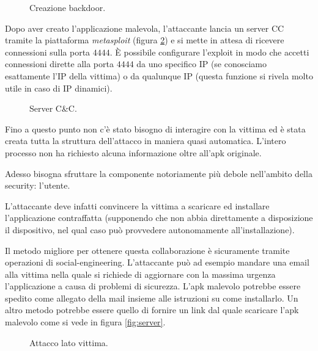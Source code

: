 \begin{figure}[h]
	\centering
	\caption{Creazione backdoor.}
	\label{fig:backdoor} 
\end{figure}

Dopo aver creato l'applicazione malevola, l'attaccante lancia un server \ac{CC} tramite la piattaforma \emph{metasploit} (figura \ref{fig:metasploit}) e si mette in attesa di ricevere connessioni sulla porta $4444$. È possibile configurare l'exploit in modo che accetti connessioni dirette alla porta $4444$ da uno specifico IP (se conosciamo esattamente l'IP della vittima) o da qualunque IP (questa funzione si rivela molto utile in caso di IP dinamici).

\begin{figure}[h]
	\centering
	\caption{Server C\&C.}
	\label{fig:metasploit}
\end{figure}

Fino a questo punto non c'è stato bisogno di interagire con la vittima ed è stata creata tutta la struttura dell'attacco in maniera quasi automatica. L'intero processo non ha richiesto alcuna informazione oltre all'apk originale.

Adesso bisogna sfruttare la componente notoriamente più debole nell'ambito della security: l'utente.

L'attaccante deve infatti convincere la vittima a scaricare ed installare l'applicazione contraffatta (supponendo che non abbia direttamente a disposizione il dispositivo, nel qual caso può provvedere autonomamente all'installazione).

Il metodo migliore per ottenere questa collaborazione è sicuramente tramite operazioni di social-engineering. L'attaccante può ad esempio mandare una email alla vittima nella quale si richiede di aggiornare con la massima urgenza l'applicazione a causa di problemi di sicurezza. L'apk malevolo potrebbe essere spedito come allegato della mail insieme alle istruzioni su come installarlo. Un altro metodo potrebbe essere quello di fornire un link dal quale scaricare l'apk malevolo come si vede in figura \ref{fig:server}.

\begin{figure}[h]
	\centering
	\caption{Attacco lato vittima.}
\end{figure}

